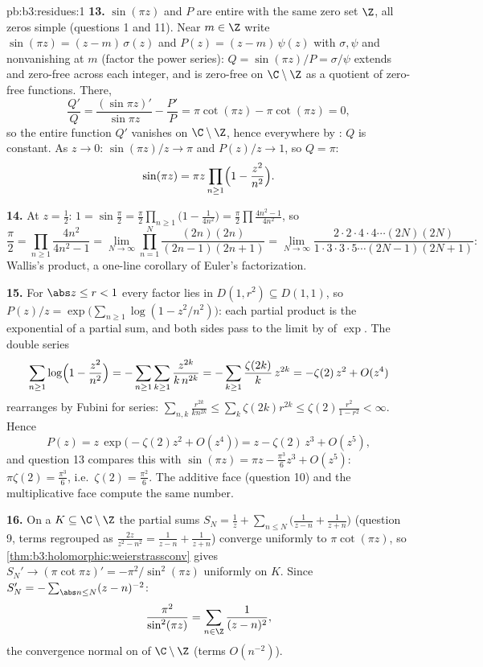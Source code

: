 \begin{solution}{pb:b3:residues:1}
\textbf{13.} $\sin(\pi z)$ and $P$ are entire with the same
zero set $\Z$, all zeros simple (questions 1 and 11). Near
$m \in \Z$ write $\sin(\pi z) = (z - m)\,\sigma(z)$ and
$P(z) = (z - m)\,\psi(z)$ with $\sigma, \psi$ 
and nonvanishing at $m$ (factor the power series): $Q =
\sin(\pi z)/P = \sigma/\psi$ extends  and
zero-free across each integer, and is zero-free on
$\C\setminus\Z$ as a quotient of zero-free functions. There,
\[
\frac{Q'}{Q} = \frac{(\sin\pi z)'}{\sin\pi z} -
\frac{P'}{P} = \pi\cot(\pi z) - \pi\cot(\pi z) = 0 ,
\]
so the entire function $Q'$ vanishes on $\C\setminus\Z$,
hence everywhere by : $Q$ is constant. As $z \to
0$: $\sin(\pi z)/z \to \pi$ and $P(z)/z \to 1$, so $Q =
\pi$:
\[
\sin(\pi z) = \pi z\prod_{n\geq1}
\Bigl(1 - \frac{z^2}{n^2}\Bigr) .
\]

\textbf{14.} At $z = \frac12$: $1 = \sin\frac\pi2 =
\frac\pi2\prod_{n\geq1}\bigl(1 - \frac1{4n^2}\bigr) =
\frac\pi2\prod\frac{4n^2-1}{4n^2}$, so
\[
\frac\pi2 = \prod_{n\geq1}\frac{4n^2}{4n^2 - 1}
= \lim_{N\to\infty}\prod_{n=1}^N
\frac{(2n)(2n)}{(2n-1)(2n+1)}
= \lim_{N\to\infty}
\frac{2\cdot2\cdot4\cdot4\cdots(2N)(2N)}
{1\cdot3\cdot3\cdot5\cdots(2N-1)(2N+1)} :
\]
Wallis's product, a one-line corollary of Euler's
factorization.

\textbf{15.} For $\abs z \leq r < 1$ every factor lies in
$D(1, r^2) \subseteq D(1, 1)$, so $P(z)/z = \exp\bigl(
\sum_{n\geq1}\log(1 - z^2/n^2)\bigr)$: each partial product
is the exponential of a partial sum, and both sides pass to
the limit by  of $\exp$. The double series
\[
\sum_{n\geq1}\log\Bigl(1 - \frac{z^2}{n^2}\Bigr)
= -\sum_{n\geq1}\sum_{k\geq1}\frac{z^{2k}}{k\,n^{2k}}
= -\sum_{k\geq1}\frac{\zeta(2k)}k\,z^{2k}
= -\zeta(2)\,z^2 + O(z^4)
\]
rearranges by Fubini for series: $\sum_{n,k}
\frac{r^{2k}}{kn^{2k}} \leq \sum_k\zeta(2k)r^{2k} \leq
\zeta(2)\frac{r^2}{1-r^2} < \infty$. Hence
\[
P(z) = z\,\exp\bigl(-\zeta(2)z^2 + O(z^4)\bigr)
= z - \zeta(2)\,z^3 + O(z^5) ,
\]
and question 13 compares this with $\sin(\pi z) = \pi z -
\frac{\pi^3}6z^3 + O(z^5)$: $\pi\zeta(2) = \frac{\pi^3}6$,
i.e.\ $\zeta(2) = \frac{\pi^2}6$. The additive face
(question 10) and the multiplicative face compute the same
number.

\textbf{16.} On a  $K \subseteq \C\setminus\Z$ the
partial sums $S_N = \frac1z + \sum_{n\leq N}\bigl(
\frac1{z-n} + \frac1{z+n}\bigr)$ (question 9, terms
regrouped as $\frac{2z}{z^2-n^2} = \frac1{z-n} +
\frac1{z+n}$) converge uniformly to $\pi\cot(\pi z)$, so
\cref{thm:b3:holomorphic:weierstrassconv} gives $S_N' \to
(\pi\cot\pi z)' = -\pi^2/\sin^2(\pi z)$ uniformly on $K$.
Since $S_N' = -\sum_{\abs n\leq N}(z - n)^{-2}$:
\[
\frac{\pi^2}{\sin^2(\pi z)} =
\sum_{n\in\Z}\frac1{(z - n)^2} ,
\]
the convergence normal on  of $\C\setminus\Z$
(terms $O(n^{-2})$).


\end{solution}

